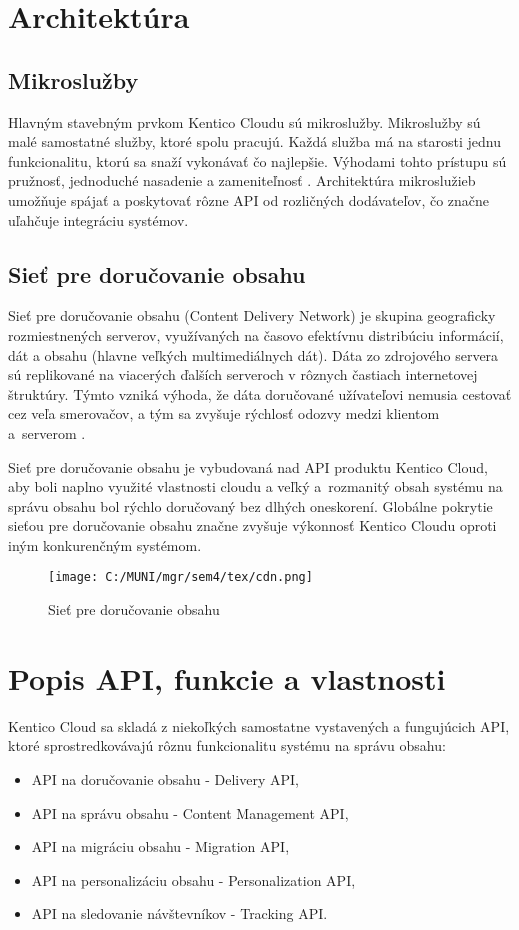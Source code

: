 \documentclass[
  printed, %
  table,   %
  lof,     %
  nolot,     %
  twoside,  
]{fithesis3}
\begin{document}
\section{Architektúra}
\subsection{Mikroslužby}
Hlavným stavebným prvkom Kentico Cloudu sú mikroslužby. Mikroslužby sú malé samostatné služby, ktoré spolu pracujú. Každá služba má na starosti jednu funkcionalitu, ktorú sa snaží vykonávať čo najlepšie. Výhodami tohto prístupu sú pružnosť, jednoduché nasadenie a zameniteľnosť \cite{micro}. Architektúra mikroslužieb umožňuje spájať a poskytovať rôzne API od rozličných dodávateľov, čo značne uľahčuje integráciu systémov.
\subsection{Sieť pre doručovanie obsahu}
Sieť pre doručovanie obsahu (Content Delivery Network) je skupina geograficky rozmiestnených serverov, využívaných na časovo efektívnu distribúciu informácií, dát a obsahu (hlavne veľkých multimediálnych dát). Dáta zo zdrojového servera sú replikované na viacerých ďalších serveroch v rôznych častiach internetovej štruktúry. Týmto vzniká výhoda, že dáta doručované užívateľovi nemusia cestovať cez  veľa smerovačov, a tým sa zvyšuje rýchlosť odozvy medzi klientom a~serverom \cite{cdn}. 

Sieť pre doručovanie obsahu je vybudovaná nad API produktu Kentico Cloud, aby boli naplno využité vlastnosti cloudu a veľký a~rozmanitý obsah systému na správu obsahu bol rýchlo doručovaný bez dlhých oneskorení. Globálne pokrytie sieťou pre doručovanie obsahu značne zvyšuje výkonnosť Kentico Cloudu oproti iným konkurenčným systémom.
\begin{figure}[h]
  \begin{center}
        \texttt{[image: C:/MUNI/mgr/sem4/tex/cdn.png]}
  \end{center}
  \caption{Sieť pre doručovanie obsahu \cite{cmsGuide}}
  \label{fig:cdn}
\end{figure}
 
\section{Popis API, funkcie a vlastnosti}
Kentico Cloud sa skladá z niekoľkých samostatne vystavených a fungujúcich API, ktoré sprostredkovávajú rôznu funkcionalitu systému na správu obsahu: 
\begin{itemize}
	\item API na doručovanie obsahu - Delivery API,
	\item API na správu obsahu - Content Management API,
	\item API na migráciu obsahu - Migration API,
	\item API na personalizáciu obsahu - Personalization API,
	\item API na sledovanie návštevníkov - Tracking API.
\end{itemize}
\end{document}
